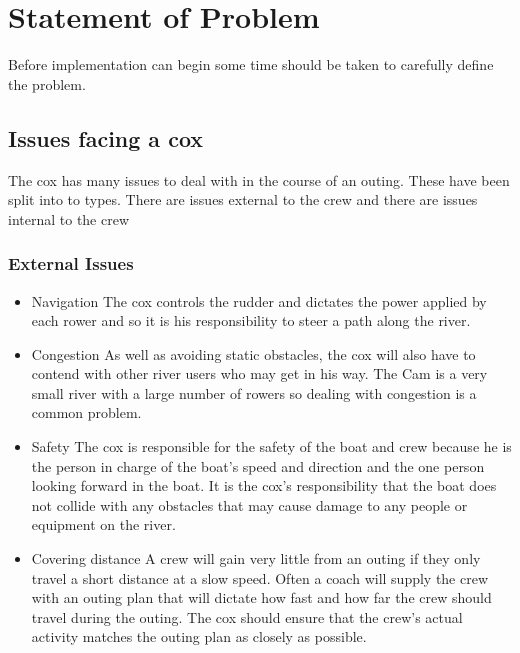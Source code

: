 \chapter{Statement of Problem}

Before implementation can begin some time should be taken to carefully define the problem.

\section{Issues facing a cox}
The cox has many issues to deal with in the course of an outing. These have been split into to types. There are issues external to the crew and there are issues internal to the crew

\subsection{External Issues}
\begin{itemize}
  
  \item{Navigation} The cox controls the rudder and dictates the power applied by each rower and so it is his responsibility to steer a path along the river.
  
  \item{Congestion} As well as avoiding static obstacles, the cox will also have to contend with other river users who may get in his way. The Cam is a very small river with a large number of rowers so dealing with congestion is a common problem.
  
  \item{Safety} The cox is responsible for the safety of the boat and crew because he is the person in charge of the boat's speed and direction and the one person looking forward in the boat. It is the cox's responsibility that the boat does not collide with any obstacles that may cause damage to any people or equipment on the river.
  
  \item{Covering distance} A crew will gain very little from an outing if they only travel a short distance at a slow speed. Often a coach will supply the crew with an outing plan that will dictate how fast and how far the crew should travel during the outing. The cox should ensure that the crew's actual activity matches the outing plan as closely as possible.
  
\end{itemize}

